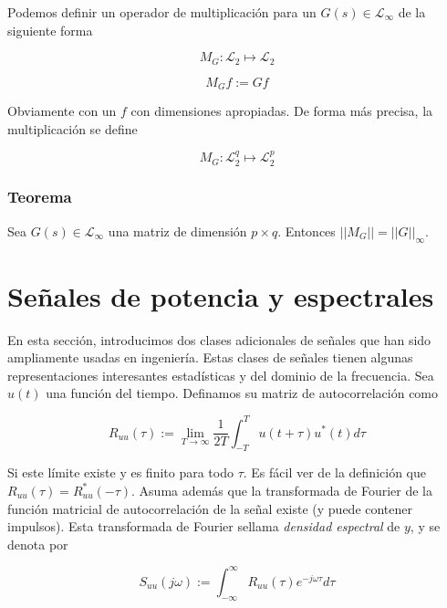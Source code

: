 Podemos definir un operador de multiplicación para un $G(s) \in \mathcal{L}_\infty$ de la siguiente forma

\begin{equation*}
    M_G : \mathcal{L}_2 \mapsto \mathcal{L}_2
\end{equation*}

\begin{equation*}
    M_G f := G f
\end{equation*}

Obviamente con un $f$ con dimensiones apropiadas. De forma más precisa, la multiplicación se define

\begin{equation*}
    M_G : \mathcal{L}_2^q \mapsto \mathcal{L}_2^p
\end{equation*}

\subsubsection{Teorema} Sea $G(s) \in \mathcal{L}_\infty$ una matriz de dimensión $p \times q$. Entonces $||M_G|| = ||G||_\infty$.



\section{Señales de potencia y espectrales}

En esta sección, introducimos dos clases adicionales de señales que han sido ampliamente usadas en ingeniería. Estas clases de señales tienen algunas representaciones interesantes estadísticas y del dominio de la frecuencia. Sea $u(t)$ una función del tiempo. Definamos su matriz de autocorrelación como

\begin{equation*}
    R_{uu}(\tau) := \lim_{T \to \infty} \frac{1}{2T}\int_{-T}^{T} u(t+ \tau)u^{*}(t)d\tau
\end{equation*}

Si este límite existe y es finito para todo $\tau$. Es fácil ver de la definición que $R_{uu}(\tau) = R_{uu}^{*}(-\tau)$. Asuma además que la transformada de Fourier de la función matricial de autocorrelación de la señal existe (y puede contener impulsos). Esta transformada de Fourier sellama \textit{densidad espectral} de $y$, y se denota por

\begin{equation*}
    S_{uu}(j\omega) := \int_{-\infty}^{\infty} R_{uu}(\tau)e^{-j \omega \tau} d \tau
\end{equation*}

